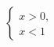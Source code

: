 \documentclass[preview]{standalone}
\begin{document}
\begin{align*}
\begin{cases}x>0, \\ x <1 \end{cases}
\end{align*}
\end{document}
